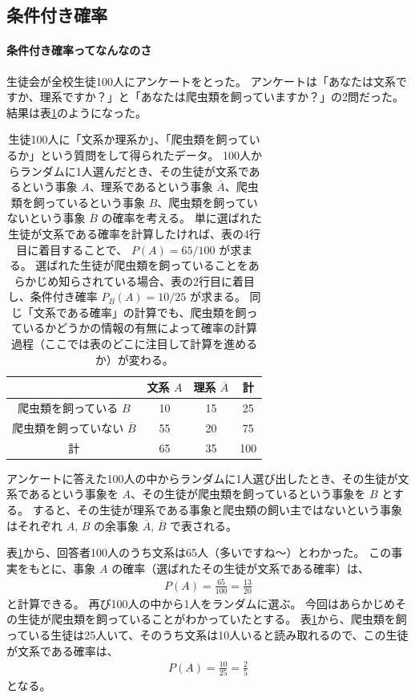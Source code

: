\documentclass[12pt]{ltjsarticle}\usepackage{ifthen}\newcounter{enlarge}\setcounter{enlarge}{1}
\begin{document}
\subsection{条件付き確率}

\paragraph{条件付き確率ってなんなのさ}

生徒会が全校生徒100人にアンケートをとった。
アンケートは「あなたは文系ですか、理系ですか？」と「あなたは爬虫類を飼っていますか？」の2問だった。
結果は表\ref{t:3.1}のようになった。

\begin{table}[tb]
\captionsetup{width=.9\linewidth}
\caption{%
  生徒100人に「文系か理系か」、「爬虫類を飼っているか」という質問をして得られたデータ。
  100人からランダムに1人選んだとき、その生徒が文系であるという事象 $A$、理系であるという事象 $\overline{A}$、爬虫類を飼っているという事象 $B$、爬虫類を飼っていないという事象 $\overline{B}$ の確率を考える。
  単に選ばれた生徒が文系である確率を計算したければ、表の4行目に着目することで、 $P(A) = 65/100$ が求まる。
  選ばれた生徒が爬虫類を飼っていることをあらかじめ知らされている場合、表の2行目に着目し、条件付き確率 $P_B (A) = 10/25$ が求まる。
  同じ「文系である確率」の計算でも、爬虫類を飼っているかどうかの情報の有無によって確率の計算過程（ここでは表のどこに注目して計算を進めるか）が変わる。
}
\label{t:3.1}
\centering
\begin{tabular}{c|cc|c} \hline
 & 文系 $A$ & 理系 $\overline{A}$ & 計 \\ \hline
爬虫類を飼っている $B$ & 10 & 15 & 25 \\
爬虫類を飼っていない $\overline{B}$ & 55 & 20 & 75 \\ \hline
計 & 65 & 35 & 100 \\ \hline
\end{tabular}    
\end{table}

アンケートに答えた100人の中からランダムに1人選び出したとき、その生徒が文系であるという事象を $A$、その生徒が爬虫類を飼っているという事象を $B$ とする。
すると、その生徒が理系である事象と爬虫類の飼い主ではないという事象はそれぞれ $A$, $B$ の余事象 $\overline{A}$, $\overline{B}$ で表される。

表\ref{t:3.1}から、回答者100人のうち文系は65人（多いですね〜）とわかった。
この事実をもとに、事象 $A$ の確率（選ばれたその生徒が文系である確率）は、
\begin{align}
  P(A) = \frac{65}{100} = \frac{13}{20} \label{eq:3.1}
\end{align}
と計算できる。
再び100人の中から1人をランダムに選ぶ。
今回はあらかじめその生徒が爬虫類を飼っていることがわかっていたとする。
表\ref{t:3.1}から、爬虫類を飼っている生徒は25人いて、そのうち文系は10人いると読み取れるので、この生徒が文系である確率は、
\begin{align}
  P(A) = \frac{10}{25} = \frac{2}{5} \label{eq:3.2}
\end{align}
となる。
\end{document}
